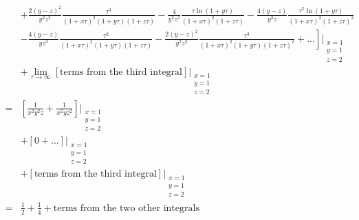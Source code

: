 \documentclass[11pt]{article}
\begin{document}
\begin{align}
    &+\left. \frac{2(y-z)^2}{y^2z^2}\frac{\tau^3}{(1+x\tau)^2(1+y\tau)(1+z\tau)}
    - \frac{4}{y^2z^2}\frac{\tau\ln(1+y\tau)}{(1+x\tau)^2(1+z\tau)} 
    - \frac{4(y-z)}{y^3z}\frac{\tau^2\ln(1+y\tau)}{(1+x\tau)^2(1+z\tau)^2} \right. \\\nonumber
    &- \left. \frac{4(y-z)}{yz^3}\frac{\tau^2}{(1+x\tau)^2(1+y\tau)(1+z\tau)} 
    - \frac{2(y-z)^2}{y^2z^2}\frac{\tau^3}{(1+x\tau)^2(1+y\tau)(1+z\tau)^2}
    + ...\right]\Bigg\vert_{\substack{x=1 \\ y=1 \\ z=2}} \\\nonumber
    &+ \lim_{\tau\to\infty} \left[\textrm{terms from the third integral}\right]\Bigg\vert_{\substack{x=1 \\ y=1 \\ z=2}} \\\nonumber
    =&{}\left[\frac{1}{x^2y^2z}+\frac{1}{x^2yz^2}\right]\Bigg\vert_{\substack{x=1 \\ y=1 \\ z=2}} \\\nonumber
    &+\left[0+...\right]\Bigg\vert_{\substack{x=1 \\ y=1 \\ z=2}} \\\nonumber
    &+ \left[\textrm{terms from the third integral}\right]\Bigg\vert_{\substack{x=1 \\ y=1 \\ z=2}} \\\nonumber
    =&{}\frac{1}{2}+\frac{1}{4}+\textrm{terms from the two other integrals}
\end{align}
\end{document}

